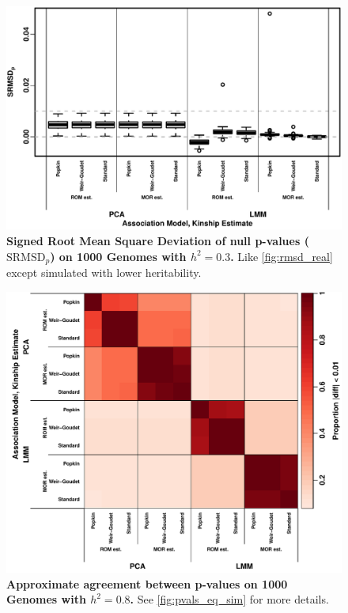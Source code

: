 \documentclass[11pt]{article}
\newcommand{\rmsd}{\text{SRMSD}_p}
\begin{document}
\begin{figure}[hp!]
  \centering
  \includegraphics[width=\textwidth]{tgp-nygc-autosomes_ld_prune_1000kb_0.3_maf-0.01/h-0.3/rmsd.pdf}
  \caption{
    {\bf Signed Root Mean Square Deviation of null p-values ($\rmsd$) on 1000 Genomes with $h^2=0.3$.}
    Like \cref{fig:rmsd_real} except simulated with lower heritability.
  }
  \label{fig:rmsd_real-h3}
\end{figure}

\begin{figure}[bp!]
  \centering
  \includegraphics[width=\textwidth]{tgp-nygc-autosomes_ld_prune_1000kb_0.3_maf-0.01/pvals_eq.pdf}
  \caption{
    {\bf Approximate agreement between p-values on 1000 Genomes with $h^2=0.8$.}
    See \cref{fig:pvals_eq_sim} for more details.
  }
  \label{fig:pvals_eq_real}
\end{figure}
\end{document}

